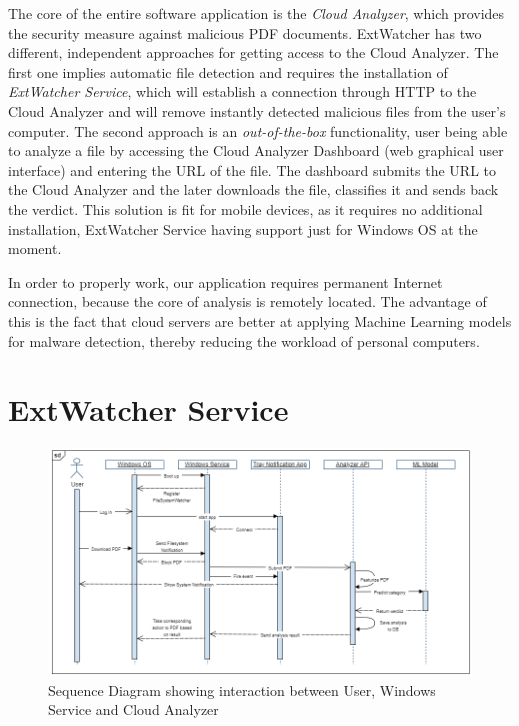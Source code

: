 The core of the entire software application is the \textit{Cloud Analyzer}, which provides the security measure against malicious PDF documents. ExtWatcher has two different, independent approaches for getting access to the Cloud Analyzer. The first one implies automatic file detection and requires the installation of \textit{ExtWatcher Service}, which will establish a connection through HTTP to the Cloud Analyzer and will remove instantly detected malicious files from the user's computer. The second approach is an \textit{out-of-the-box} functionality, user being able to analyze a file by accessing the Cloud Analyzer Dashboard (web graphical user interface) and entering the URL of the file. The dashboard submits the URL to the Cloud Analyzer and the later downloads the file, classifies it and sends back the verdict. This solution is fit for mobile devices, as it requires no additional installation, ExtWatcher Service having support just for Windows OS at the moment. \par
In order to properly work, our application requires permanent Internet connection, because the core of analysis is remotely located. The advantage of this is the fact that cloud servers are better at applying Machine Learning models for malware detection, thereby reducing the workload of personal computers. 



\section{ExtWatcher Service}
\label{section:winService}


\begin{figure}[H]
	\centerline{\includegraphics[scale=0.55]{figures/sequence.png}}  
	\caption{Sequence Diagram showing interaction between User, Windows Service and Cloud Analyzer}
	\label{sequence}
\end{figure}


